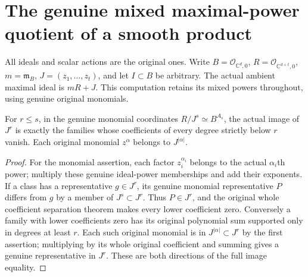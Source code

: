 \section{The genuine mixed maximal-power quotient of a smooth product}

All ideals and scalar actions are the original ones. Write
$B=\mathcal O_{\mathbb C^d,0}$, $R=\mathcal O_{\mathbb C^{d+t},0}$,
$m=\mathfrak m_B$, $J=(z_1,\ldots,z_t)$, and let $I\subset B$ be arbitrary.
The actual ambient maximal ideal is $mR+J$. This computation retains its
mixed powers throughout, using genuine original monomials.

\begin{lemma}
\label{hir:actual-product-monomial-normal-power-filtration}
\leanok
For $r\le s$, in the genuine monomial coordinates
$R/J^s\simeq B^{A_s}$, the actual image of $J^r$ is exactly the families
whose coefficients of every degree strictly below $r$ vanish.
Each original monomial $z^\alpha$ belongs to $J^{|\alpha|}$.
\end{lemma}
\begin{proof}
For the monomial assertion, each factor $z_i^{\alpha_i}$ belongs to the
actual $\alpha_i$th power; multiply these genuine ideal-power memberships
and add their exponents. If a class has a representative $g\in J^r$,
its genuine monomial representative $P$ differs from $g$ by a member of
$J^s\subset J^r$. Thus $P\in J^r$, and the original whole coefficient
separation theorem makes every lower coefficient zero. Conversely a
family with lower coefficients zero has its original polynomial sum
supported only in degrees at least $r$. Each such original monomial is
in $J^{|\alpha|}\subset J^r$ by the first assertion; multiplying by its
whole original coefficient and summing gives a genuine representative
in $J^r$. These are both directions of the full image equality.
\end{proof}

